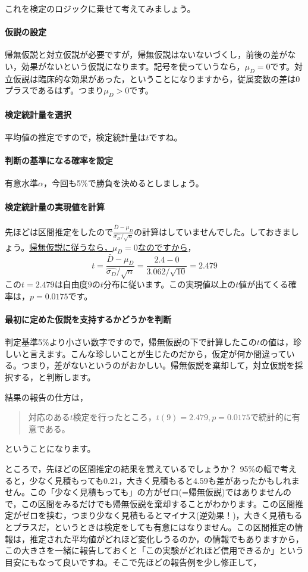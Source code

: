 \documentclass{ltjsbook}
\begin{document}
これを検定のロジックに乗せて考えてみましょう。
\paragraph{仮説の設定}帰無仮説と対立仮説が必要ですが，帰無仮説はないないづくし，前後の差がない，効果がないという仮説になります。記号を使っていうなら，$\mu_D=0$です。対立仮説は臨床的な効果があった，ということになりますから，従属変数の差は0プラスであるはず。つまり$\mu_D > 0$です。
\paragraph{検定統計量を選択}平均値の推定ですので，検定統計量は$t$ですね。
\paragraph{判断の基準になる確率を設定}有意水準$\alpha$，今回も5\%で勝負を決めるとしましょう。
\paragraph{検定統計量の実現値を計算}先ほどは区間推定をしたので$\frac{\bar{D}-\mu_D}{\hat{\sigma_D}/\sqrt{n}} $の計算はしていませんでした。しておきましょう。\underline{帰無仮説に従うなら，$\mu_D=0$なのですから}，
\[t= \frac{\bar{D}-\mu_D}{\hat{\sigma_D}/\sqrt{n}}  = \frac{2.4-0}{3.062/\sqrt{10}}  = 2.479\]
この$t = 2.479$は自由度$9$の$t$分布に従います。この実現値以上の$t$値が出てくる確率は，$p=0.0175$です。
\paragraph{最初に定めた仮説を支持するかどうかを判断}
判定基準5\%より小さい数字ですので，帰無仮説の下で計算したこの$t$の値は，珍しいと言えます。こんな珍しいことが生じたのだから，仮定が何か間違っている。つまり，差がないというのがおかしい。帰無仮説を棄却して，対立仮説を採択する，と判断します。

結果の報告の仕方は，
\begin{quote}
	対応のある$t$検定を行ったところ，$t(9)=2.479,p=0.0175$で統計的に有意である。
\end{quote}
ということになります。

ところで，先ほどの区間推定の結果を覚えているでしょうか？ 95\%の幅で考えると，少なく見積もっても0.21，大きく見積もると4.59も差があったかもしれません。この「少なく見積もっても」の方がゼロ(=帰無仮説)ではありませんので，この区間をみるだけでも帰無仮説を棄却することがわかります。この区間推定がゼロを挟む，つまり少なく見積もるとマイナス(逆効果！)，大きく見積もるとプラスだ，というときは検定をしても有意にはなりません。この区間推定の情報は，推定された平均値がどれほど変化しうるのか，の情報でもありますから，この大きさを一緒に報告しておくと「この実験がどれほど信用できるか」という目安にもなって良いですね。そこで先ほどの報告例を少し修正して，
\end{document}
